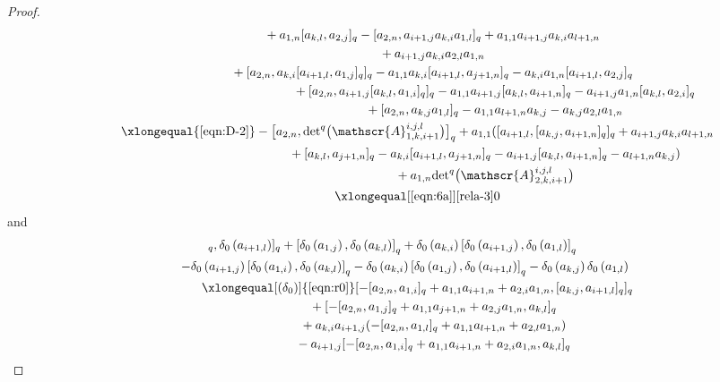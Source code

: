 \documentclass[pdftex]{sigma}
\numberwithin{equation}{section}
\def\lr#1{\left[#1\right]}
\def\lrb#1{\left(#1\right)}
\def\d{\delta}
\def\A{\mathscr{A}}
\begin{document}
\begin{proof}
\begin{gather*}
 \phantom{\qquad\qquad \qquad\ }{} +a_{1,n} [a_{k,l}, a_{2,j} ]_q - [a_{2,n},a_{i+1,j}a_{k,i}a_{1,l} ]_q +a_{1,1}a_{i+1,j}a_{k,i}a_{l+1,n} \\
 \phantom{\qquad\qquad \qquad\ }{}
 +a_{i+1,j}a_{k,i}a_{2,l}a_{1,n} \\
 \phantom{\qquad\qquad \qquad\ }{} + [a_{2,n},a_{k,i} [a_{i+1,l},a_{1,j} ]_q ]_q-a_{1,1}a_{k,i} [a_{i+1,l}, a_{j+1,n} ]_q -a_{k,i}a_{1,n} [a_{i+1,l},a_{2,j} ]_q\\
 \phantom{\qquad\qquad \xlongequal{\eqref{equ:comm2}} }{} + [a_{2,n},a_{i+1,j} [a_{k,l},a_{1,i} ]_q ]_q -a_{1,1}a_{i+1,j} [a_{k,l},a_{i+1,n} ]_q -a_{i+1,j}a_{1,n} [a_{k,l},a_{2,i} ]_q \\
 \phantom{\qquad\qquad \xlongequal{\eqref{equ:comm2}} }{}+ [a_{2,n},a_{k,j}a_{1,l} ]_q-a_{1,1}a_{l+1,n}a_{k,j}-a_{k,j}a_{2,l}a_{1,n}\\
 \qquad\qquad \xlongequal{\eqref{eqn:D-2}} - \bigl[a_{2,n},{\det}^q \bigl(\A_{1,k,i+1}^{i,j,l} \bigr) \bigr]_q +a_{1,1} ( [a_{i+1,l}, [a_{k,j}, a_{i+1,n} ]_q ]_q +a_{i+1,j}a_{k,i}a_{l+1,n} \\
 \phantom{\qquad\qquad \xlongequal{\eqref{eqn:D-2}}}{} + [a_{k,l},a_{j+1,n} ]_q-a_{k,i} [a_{i+1,l}, a_{j+1,n} ]_q -a_{i+1,j} [a_{k,l},a_{i+1,n} ]_q -a_{l+1,n}a_{k,j} )\\
 \phantom{\qquad\qquad \xlongequal{\eqref{eqn:D-2}}}{}+a_{1,n}{\det}^q \bigl(\A_{2,k,i+1}^{i,j,l} \bigr)\\
\qquad\qquad \xlongequal[\eqref{eqn:6a}]{\eqref{rela-3}} 0
\end{gather*}
and
\begin{gather*}
 [\lr{\d_0\lrb{a_{1,i}}, \d_0\lrb{a_{k,j}}}_q, \d_0\lrb{a_{i+1,l}}]_q+ \lr{\d_0\lrb{a_{1,j}}, \d_0\lrb{a_{k,l}}}_q +\d_0\lrb{a_{k,i}}\lr{\d_0\lrb{a_{i+1,j}}, \d_0\lrb{a_{1,l}}}_q \\
 \qquad -\d_0\lrb{a_{i+1,j}}\lr{\d_0\lrb{a_{1,i}}, \d_0\lrb{a_{k,l}}}_q -\d_0\lrb{a_{k,i}}\lr{\d_0\lrb{a_{1,j}}, \d_0\lrb{a_{i+1,l}}}_q-\d_0\lrb{a_{k,j}} \d_0\lrb{a_{1,l}}\\
 \qquad\qquad\xlongequal[(\d_0)]{\eqref{eqn:r0}} [ - [a_{2,n},a_{1,i} ]_q +a_{1,1}a_{i+1,n}+a_{2,i}a_{1,n}, [a_{k,j}, a_{i+1,l} ]_q ]_q\\
\phantom{\qquad\qquad\qquad\ \,}{} + [ - [a_{2,n},a_{1,j} ]_q+a_{1,1}a_{j+1,n}+a_{2,j}a_{1,n}, a_{k,l} ]_q \\
\phantom{\qquad\qquad\qquad\ \,}{} +a_{k,i}a_{i+1,j} (- [a_{2,n},a_{1,l} ]_q+a_{1,1}a_{l+1,n}+a_{2,l}a_{1,n} ) \\
 \phantom{\qquad\qquad\qquad\ \,}{} -a_{i+1,j} [ - [a_{2,n},a_{1,i} ]_q+a_{1,1}a_{i+1,n}+a_{2,i}a_{1,n}, a_{k,l} ]_q \\

\end{gather*}
\end{proof}
\end{document}

